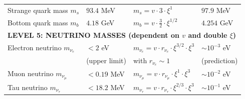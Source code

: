 \begin{table}[htbp]
{\begin{tabular}{p{3.8cm}p{2.5cm}p{3.5cm}p{2.8cm}}
	Strange quark mass $m_s$ & $93.4$ MeV & $m_s = v \cdot 3 \cdot \xi^1$ & $97.9$ MeV \\
	
	Bottom quark mass $m_b$ & $4.18$ GeV & $m_b = v \cdot \frac{3}{2} \cdot \xi^{1/2}$ & $4.254$ GeV \\
	
	\midrule
	\multicolumn{4}{l}{\textbf{LEVEL 5: NEUTRINO MASSES (dependent on $v$ and double $\xi$)}} \\
	\midrule
	
	Electron neutrino $m_{\nu_e}$ & $< 2$ eV & $m_{\nu_e} = v \cdot r_{\nu_e} \cdot \xi^{3/2} \cdot \xi^3$ & $\sim 10^{-3}$ eV \\
	& (upper limit) & with $r_{\nu_e} \sim 1$ & (prediction) \\[0.3em]
	
	Muon neutrino $m_{\nu_\mu}$ & $< 0.19$ MeV & $m_{\nu_\mu} = v \cdot r_{\nu_\mu} \cdot \xi^{1} \cdot \xi^3$ & $\sim 10^{-2}$ eV \\
	
	Tau neutrino $m_{\nu_\tau}$ & $< 18.2$ MeV & $m_{\nu_\tau} = v \cdot r_{\nu_\tau} \cdot \xi^{2/3} \cdot \xi^3$ & $\sim 10^{-1}$ eV \\
	
\end{tabular}%
}
\end{table}

